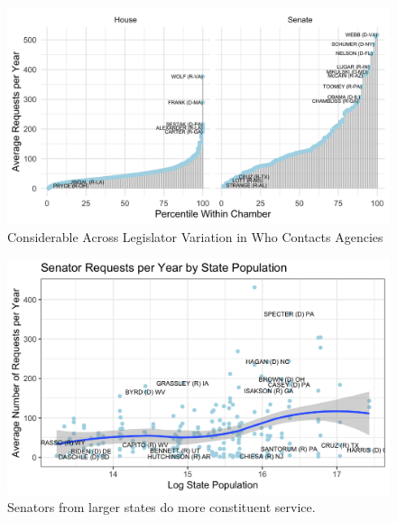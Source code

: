 \documentclass{article}
\begin{document}

\begin{figure}
\centering
\caption{Considerable Across Legislator Variation in Who Contacts Agencies}
\includegraphics[width = \textwidth]{../Figs/percentiles-1}
\end{figure}

\begin{figure}
\centering
\caption{Senators from larger states do more constituent service.}
\includegraphics[width = \textwidth]{../Figs/population-1}
\end{figure}
\end{document}
